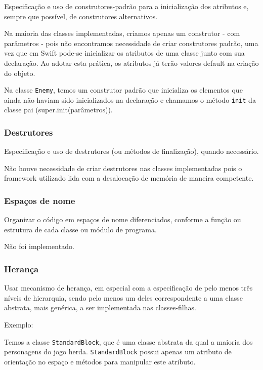 \documentclass[rel_mlp]{iiufrgs}
\begin{document}
Especificação e uso de construtores-padrão para a inicialização dos atributos e, sempre que possível, de construtores alternativos.

Na maioria das classes implementadas, criamos apenas um construtor - com parâmetros - pois não encontramos necessidade de criar construtores padrão, uma vez que em Swift pode-se inicializar os atributos de uma classe junto com sua declaração. Ao adotar esta prática, os atributos já terão valores default na criação do objeto.

Na classe \texttt{Enemy}, temos um construtor padrão que inicializa os elementos que ainda não haviam sido inicializados na declaração e chamamos o método \texttt{init} da classe pai (super.init(parâmetros)).


\subsubsection{Destrutores}

Especificação e uso de destrutores (ou métodos de finalização), quando necessário.

Não houve necessidade de criar destrutores nas classes implementadas pois o framework utilizado lida com a desalocação de memória de maneira competente.


\subsubsection{Espaços de nome}

Organizar o código em espaços de nome diferenciados, conforme a função ou estrutura de cada classe ou módulo de programa.

Não foi implementado.


\subsubsection{Herança}

Usar mecanismo de herança, em especial com a especificação de pelo menos três níveis de hierarquia, sendo pelo menos um deles correspondente a uma classe abstrata, mais genérica, a ser implementada nas classes-filhas.

Exemplo:

Temos a classe \texttt{StandardBlock}, que é uma classe abstrata da  qual a maioria dos personagens do jogo herda. \texttt{StandardBlock} possui apenas um atributo de orientação no espaço e métodos para manipular este atributo.
\end{document}
